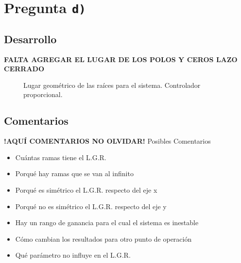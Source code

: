 \section{Pregunta \texttt{d)}}\label{pregunta-d}

\subsection{Desarrollo}

\textbf{FALTA AGREGAR EL LUGAR DE LOS POLOS Y CEROS LAZO CERRADO}

\begin{figure}[ht]
  \centering
  
  \caption{Lugar geométrico de las raíces para el sistema. Controlador proporcional.}
  \label{fig:lgr-c}
\end{figure}


\FloatBarrier
\subsection{Comentarios}


\textbf{!AQUÍ COMENTARIOS NO OLVIDAR!}
Posibles Comentarios
\begin{itemize}
    \item Cuántas ramas tiene el L.G.R.
    \item Porqué hay ramas que se van al infinito
    \item Porqué es simétrico el L.G.R. respecto del eje x
    \item Porqué no es simétrico el L.G.R. respecto del eje y
    \item Hay un rango de ganancia para el cual el sistema es inestable
    \item Cómo cambian los resultados para otro punto de operación
    \item Qué parámetro no influye en el L.G.R.
\end{itemize}
